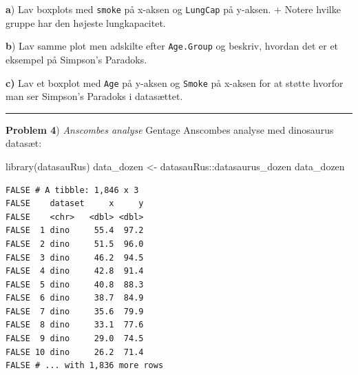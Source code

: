 \documentclass[
]{book}
\newenvironment{Shaded}{\begin{snugshade}}{\end{snugshade}}
\newcommand{\AttributeTok}[1]{\textcolor[rgb]{0.77,0.63,0.00}{#1}}
\newcommand{\ConstantTok}[1]{\textcolor[rgb]{0.00,0.00,0.00}{#1}}
\newcommand{\DecValTok}[1]{\textcolor[rgb]{0.00,0.00,0.81}{#1}}
\newcommand{\FunctionTok}[1]{\textcolor[rgb]{0.00,0.00,0.00}{#1}}
\newcommand{\NormalTok}[1]{#1}
\newcommand{\OtherTok}[1]{\textcolor[rgb]{0.56,0.35,0.01}{#1}}
\newcommand{\SpecialCharTok}[1]{\textcolor[rgb]{0.00,0.00,0.00}{#1}}
\newcommand{\StringTok}[1]{\textcolor[rgb]{0.31,0.60,0.02}{#1}}
\begin{document}
\begin{Shaded}
\end{Shaded}

\textbf{a}) Lav boxplots med \texttt{smoke} på x-aksen og \texttt{LungCap} på y-aksen.
+ Notere hvilke gruppe har den højeste lungkapacitet.

\textbf{b}) Lav samme plot men adskilte efter \texttt{Age.Group} og beskriv, hvordan det er et eksempel på Simpson's Paradoks.

\textbf{c)} Lav et boxplot med \texttt{Age} på y-aksen og \texttt{Smoke} på x-aksen for at støtte hvorfor man ser Simpson's Paradoks i datasættet.

\begin{center}\rule{0.5\linewidth}{0.5pt}\end{center}

\textbf{Problem 4}) \emph{Anscombes analyse} Gentage Anscombes analyse med dinosaurus datasæt:

\begin{Shaded}
\begin{Highlighting}[]
\FunctionTok{library}\NormalTok{(datasauRus)}
\NormalTok{data\_dozen }\OtherTok{\textless{}{-}}\NormalTok{ datasauRus}\SpecialCharTok{::}\NormalTok{datasaurus\_dozen}
\NormalTok{data\_dozen}
\end{Highlighting}
\end{Shaded}

\begin{verbatim}
FALSE # A tibble: 1,846 x 3
FALSE    dataset     x     y
FALSE    <chr>   <dbl> <dbl>
FALSE  1 dino     55.4  97.2
FALSE  2 dino     51.5  96.0
FALSE  3 dino     46.2  94.5
FALSE  4 dino     42.8  91.4
FALSE  5 dino     40.8  88.3
FALSE  6 dino     38.7  84.9
FALSE  7 dino     35.6  79.9
FALSE  8 dino     33.1  77.6
FALSE  9 dino     29.0  74.5
FALSE 10 dino     26.2  71.4
FALSE # ... with 1,836 more rows
\end{verbatim}
\end{document}
